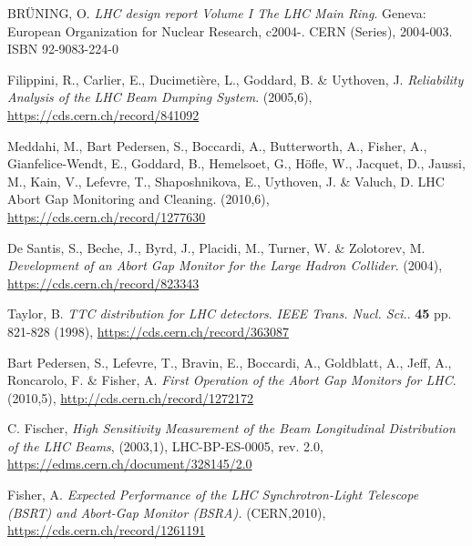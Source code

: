 %
{\printbibliography}{

    \begin{thebibliography}{99}
	
         BR\"UNING, O. \emph{LHC design report Volume I The LHC
            Main Ring}. Geneva: European Organization for Nuclear Research, c2004-. CERN
            (Series), 2004-003. ISBN 92-9083-224-0

         Filippini, R., Carlier, E., Ducimetière, L., Goddard,
            B. \& Uythoven, J. \emph{Reliability Analysis of the LHC Beam Dumping System}.
            (2005,6), \url{https://cds.cern.ch/record/841092}

        Meddahi, M., Bart Pedersen, S., Boccardi, A.,
            Butterworth, A., Fisher, A., Gianfelice-Wendt, E., Goddard, B., Hemelsoet,
            G., Höfle, W., Jacquet, D., Jaussi, M., Kain, V., Lefevre, T., Shaposhnikova,
            E., Uythoven, J. \& Valuch, D. LHC Abort Gap Monitoring and Cleaning.
            (2010,6), \url{https://cds.cern.ch/record/1277630}

        De Santis, S., Beche, J., Byrd, J., Placidi, M.,
            Turner, W. \& Zolotorev, M. \emph{Development of an Abort Gap Monitor for the
            Large Hadron Collider}.  (2004), \url{https://cds.cern.ch/record/823343}

         Taylor, B. \emph{TTC distribution for LHC detectors}.
            {\em IEEE Trans. Nucl. Sci.}. \textbf{45} pp. 821-828 (1998),
            \url{https://cds.cern.ch/record/363087}

        Bart Pedersen, S., Lefevre, T., Bravin, E., Boccardi, A.,
          Goldblatt, A., Jeff, A., Roncarolo, F. \& Fisher, A. \emph{First Operation of
          the Abort Gap Monitors for LHC}.  (2010,5), \url{http://cds.cern.ch/record/1272172}

         C. Fischer, \emph{High Sensitivity
            Measurement of the Beam Longitudinal Distribution of the LHC Beams}, 
            (2003,1), LHC-BP-ES-0005, rev. 2.0,
            \url{https://edms.cern.ch/document/328145/2.0}

        Fisher, A. \emph{Expected Performance of the LHC
            Synchrotron-Light Telescope (BSRT) and Abort-Gap Monitor (BSRA).}
            (CERN,2010), \url{https://cds.cern.ch/record/1261191}


\end{thebibliography}}
